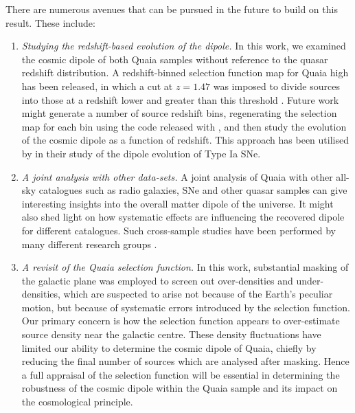 \documentclass[fleqn,usenatbib]{mnras}
\begin{document}
        There are numerous avenues that can be pursued in the future to build on this result. These include:
        \begin{enumerate}
            \item \emph{Studying the redshift-based evolution of the dipole.}
            In this work, we examined the cosmic dipole of both Quaia samples without reference to the quasar redshift distribution.
            A redshift-binned selection function map for Quaia high has been released, in which a cut at $z=1.47$ was imposed to divide sources into those at a redshift lower and greater than this threshold \citep{alonso2023}.
            Future work might generate a number of source redshift bins, regenerating the selection map for each bin using the code released with \citet{storeyfisher2023quaia}, and then study the evolution of the cosmic dipole as a function of redshift. 
            This approach has been utilised by \cite{horstmann2022} in their study of the dipole evolution of Type Ia SNe.
            \item \emph{A joint analysis with other data-sets.}
            A joint analysis of Quaia with other all-sky catalogues such as radio galaxies, SNe and other quasar samples can give interesting insights into the overall matter dipole of the universe.
            It might also shed light on how systematic effects are influencing the recovered dipole for different catalogues.
            Such cross-sample studies have been performed by many different research groups \citep[see e.g.][]{secrest2022, darling2022, wagenveld2023}.
            \item \emph{A revisit of the Quaia selection function.} In this work, substantial masking of the galactic plane was employed to screen out over-densities and under-densities, which are suspected to arise not because of the Earth's peculiar motion, but because of systematic errors introduced by the selection function.
            Our primary concern is how the selection function appears to over-estimate source density near the galactic centre.
            These density fluctuations have limited our ability to determine the cosmic dipole of Quaia, chiefly by reducing the final number of sources which are analysed after masking.
            Hence a full appraisal of the selection function will be essential in determining the robustness of the cosmic dipole within the Quaia sample and its impact on the cosmological principle.
        \end{enumerate}
        
\end{document}
